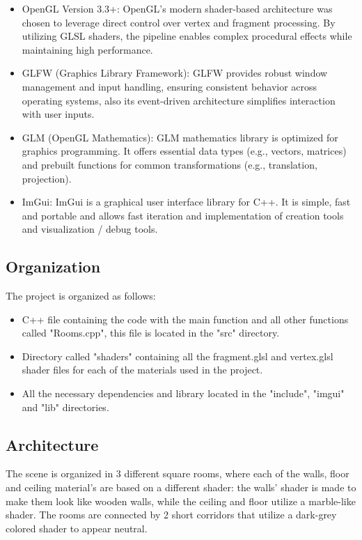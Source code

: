 \documentclass[12pt]{article}
\begin{document}
\begin{itemize}
\item OpenGL Version 3.3+:
\newline
OpenGL's modern shader-based architecture was chosen to leverage direct control over vertex and fragment processing. By utilizing GLSL shaders, the pipeline enables complex procedural effects while maintaining high performance.

\item GLFW (Graphics Library Framework):
\newline
GLFW provides robust window management and input handling, ensuring consistent behavior across operating systems, also its event-driven architecture simplifies interaction with user inputs.

\item GLM (OpenGL Mathematics):
\newline
GLM mathematics library is optimized for graphics programming. It offers essential data types (e.g., vectors, matrices) and prebuilt functions for common transformations (e.g., translation, projection).

\item ImGui:
\newline
ImGui is a graphical user interface library for C++. It is simple, fast and portable and allows fast iteration and implementation of creation tools and visualization / debug tools.
\end{itemize}

\subsection {Organization}
The project is organized as follows:
\begin{itemize}
\item C++ file containing the code with the main function and all other functions called "Rooms.cpp", this file is located in the "src" directory.
\item Directory called "shaders" containing all the fragment.glsl and vertex.glsl shader files for each of the materials used in the project.
\item All the necessary dependencies and library located in the "include", "imgui" and "lib" directories.
\end{itemize}

\newpage

\subsection{Architecture}
The scene is organized in 3 different square rooms, where each of the walls, floor and ceiling material's are based on a different shader: the walls' shader is made to make them look like wooden walls, while the ceiling and floor utilize a marble-like shader. The rooms are connected by 2 short corridors that utilize a dark-grey colored shader to appear neutral.
\end{document}
